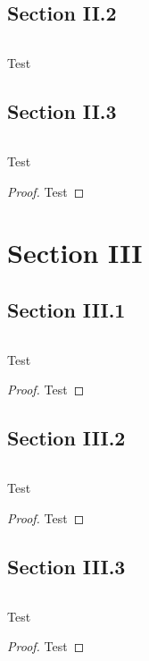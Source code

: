 \documentclass[notheorems, compress]{beamer}
\begin{document}
\subsection{Section II.2}
\begin{frame}{$ $}
    \begin{solution}[Test]\label{sol:Test}
        Test
    \end{solution}
\end{frame}

\subsection{Section II.3}
\begin{frame}{$ $}
    \begin{theorem}[Test]\label{thm:Test}
        Test
    \end{theorem}
    \begin{proof}
        Test
    \end{proof}
\end{frame}

\section{Section III}

\subsection{Section III.1}
\begin{frame}{$ $}
    \begin{proposition}[Test]\label{prop:Test}
        Test
    \end{proposition}
    \begin{proof}
        Test
    \end{proof}
\end{frame}

\subsection{Section III.2}
\begin{frame}{$ $}
    \begin{lemma}[Test]\label{lem:Test}
        Test
    \end{lemma}
    \begin{proof}
        Test
    \end{proof}
\end{frame}

\subsection{Section III.3}
\begin{frame}{$ $}
    \begin{corollary}[Test]\label{cor:Test}
        Test
    \end{corollary}
    \begin{proof}
        Test
    \end{proof}
\end{frame}
\end{document}

